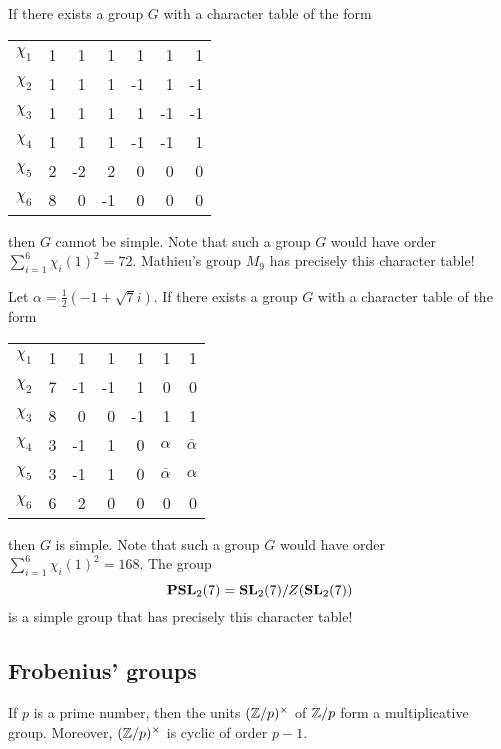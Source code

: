 \begin{example}
    If there exists a group $G$ with
    a character table 
    of the form
    \begin{center}
		\begin{tabular}{|c|rrrrrr|}
			\hline
			$\chi_{1}$ & 1 & 1 & 1 & 1 & 1 & 1\tabularnewline
			$\chi_{2}$ & 1 & 1 & 1 & -1 & 1 & -1 \tabularnewline
			$\chi_{3}$ & 1 & 1 & 1 & 1 & -1 & -1\tabularnewline
		    $\chi_{4}$ & 1 & 1 & 1 & -1 & -1 & 1\tabularnewline
			$\chi_{5}$ & 2 & -2 & 2 & 0 & 0 & 0\tabularnewline
			$\chi_{6}$ & 8 & 0 & -1 & 0 & 0 & 0\tabularnewline
			\hline
		\end{tabular}
	\end{center}
	then $G$ cannot be simple. Note that such a group $G$ would have order $\sum_{i=1}^6\chi_i(1)^2=72$. 
	Mathieu's group $M_{9}$ has precisely this character table! 
\end{example}

\begin{example}
    Let $\alpha=\frac{1}{2}(-1+\sqrt{7}i)$. 
    If there exists a group $G$ with a character table
    of the form
    \begin{center}
		\begin{tabular}{|c|rrrrrr|}
			\hline
			$\chi_{1}$ & 1 & 1 & 1 & 1 & 1 & 1\tabularnewline
			$\chi_{2}$ & 7 & -1 & -1 & 1 & 0 & 0 \tabularnewline
			$\chi_{3}$ & 8 & 0 & 0 & -1 & 1 & 1\tabularnewline
		    $\chi_{4}$ & 3 & -1 & 1 & 0 & $\alpha$ & $\overline{\alpha}$ \tabularnewline
			$\chi_{5}$ & 3 & -1 & 1 & 0 & $\overline{\alpha}$ & $\alpha$\tabularnewline
			$\chi_{6}$ & 6 & 2 & 0 & 0 & 0 & 0\tabularnewline
			\hline
		\end{tabular}
	\end{center}    
	then $G$ is simple. Note that such a group $G$ would have order 
	$\sum_{i=1}^6\chi_i(1)^2=168$. 
	The group  
	\[
	\mathbf{PSL}_2(7)=\mathbf{SL}_2(7)/Z(\mathbf{SL}_2(7))
	\]
	is a simple group that has precisely this character table!  
\end{example}

\subsection{Frobenius' groups}
\label{Frobenius}

If $p$ is a prime number, then
the units $(\mathbb{Z}/p)^{\times}$ 
of $\mathbb{Z}/p$ form a multiplicative group. Moreover, 
$(\mathbb{Z}/p)^{\times}$ 
is cyclic of order $p-1$. 

